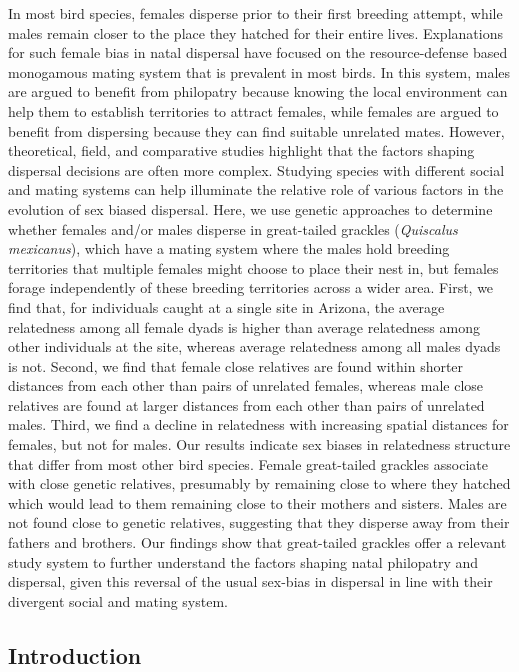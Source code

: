 \documentclass[
]{article}
\begin{document}
In most bird species, females disperse prior to their first breeding
attempt, while males remain closer to the place they hatched for their
entire lives. Explanations for such female bias in natal dispersal have
focused on the resource-defense based monogamous mating system that is
prevalent in most birds. In this system, males are argued to benefit
from philopatry because knowing the local environment can help them to
establish territories to attract females, while females are argued to
benefit from dispersing because they can find suitable unrelated mates.
However, theoretical, field, and comparative studies highlight that the
factors shaping dispersal decisions are often more complex. Studying
species with different social and mating systems can help illuminate the
relative role of various factors in the evolution of sex biased
dispersal. Here, we use genetic approaches to determine whether females
and/or males disperse in great-tailed grackles (\emph{Quiscalus
mexicanus}), which have a mating system where the males hold breeding
territories that multiple females might choose to place their nest in,
but females forage independently of these breeding territories across a
wider area. First, we find that, for individuals caught at a single site
in Arizona, the average relatedness among all female dyads is higher
than average relatedness among other individuals at the site, whereas
average relatedness among all males dyads is not. Second, we find that
female close relatives are found within shorter distances from each
other than pairs of unrelated females, whereas male close relatives are
found at larger distances from each other than pairs of unrelated males.
Third, we find a decline in relatedness with increasing spatial
distances for females, but not for males. Our results indicate sex
biases in relatedness structure that differ from most other bird
species. Female great-tailed grackles associate with close genetic
relatives, presumably by remaining close to where they hatched which
would lead to them remaining close to their mothers and sisters. Males
are not found close to genetic relatives, suggesting that they disperse
away from their fathers and brothers. Our findings show that
great-tailed grackles offer a relevant study system to further
understand the factors shaping natal philopatry and dispersal, given
this reversal of the usual sex-bias in dispersal in line with their
divergent social and mating system.

\newpage

\hypertarget{introduction}{%
\subsection{Introduction}\label{introduction}}
\end{document}
